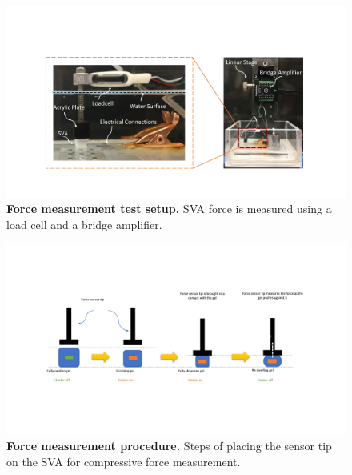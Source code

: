 \begin{figure}[h]
      \centering
      \includegraphics[width=\textwidth]{forceTestSetup.pdf}
      \caption[]{\textbf{Force measurement test setup.} SVA force is measured using a load cell and a bridge amplifier.}
      \label{fig:forceTestSetup}
\end{figure}

\begin{figure}[!h]
      \centering
      \includegraphics[width=\textwidth]{forceProcedure.pdf}
      \caption[]{\textbf{Force measurement procedure.} Steps of placing the sensor tip on the SVA for compressive force measurement.}
      \label{fig:forceProcedure}
\end{figure}

